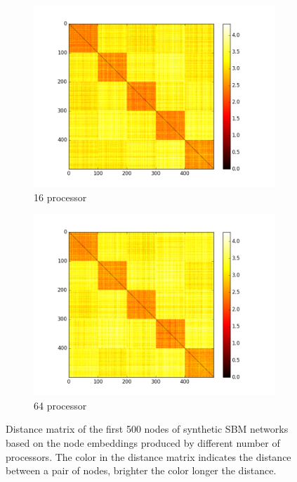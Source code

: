 \begin{figure}[ht!]
\begin{subfigure}{.45\textwidth}
\includegraphics[width=.99\linewidth]{img/chap3/heatmap_P16.png}
\caption{16 processor}\label{fig:c3}
\end{subfigure} 
\begin{subfigure}{.45\textwidth}
\centering
\includegraphics[width=.99\linewidth]{img/chap3/heatmap_P64.png}
\caption{64 processor}\label{fig:c4}
\end{subfigure} 

\caption{Distance matrix of the first 500 nodes of synthetic SBM networks based on the node embeddings produced by different number of processors. The color in the distance matrix indicates the distance between a pair of nodes, brighter the color longer the distance.}
\label{fig:tab1_fig}
\end{figure}

